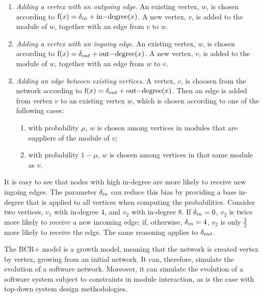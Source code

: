 \begin{enumerate}

\item \emph{Adding a vertex with an outgoing edge}. An existing vertex, $w$, is
chosen according to $\mathrm{f}(x) = \delta_{in} + \mathrm{in\relax{-}degree}(x)$. A new
vertex, $v$, is added to the module of $w$, together with an edge from $v$ to
$w$.

\item \emph{Adding a vertex with an ingoing edge}. An existing vertex, $w$, is
chosen according to $\mathrm{f}(x) = \delta_{out} + \mathrm{out\relax{-}degree}(x)$. A
new vertex, $v$, is added to the module of $w$, together with an edge from $w$
to $v$.

\item \emph{Adding an edge between existing vertices}. A vertex, $v$, is choosen
from the network according to $\mathrm{f}(x) = \delta_{out} +
\mathrm{out\relax{-}degree}(x)$.  Then an edge is added from vertex $v$ to an
existing vertex $w$, which is chosen according to one of the following cases:

\begin{enumerate}
  \item with probability $\mu$, $w$ is chosen among vertices in modules that are
  suppliers of the module of $v$;
  \item with probability $1 - \mu$, $w$ is chosen among vertices in that same
  module as $v$.
\end{enumerate}

\end{enumerate}

It is easy to see that nodes with high in-degree are more likely to receive new
ingoing edges. The parameter $\delta_{in}$ can reduce this bias by providing a base
in-degree that is applied to all vertices when computing the probabilities.
Consider two vertices, $v_1$ with in-degree 4, and $v_2$ with in-degree 8. If
$\delta_{in} = 0$, $v_2$ is twice more likely to receive a new incoming edge; if,
otherwise, $\delta_{in} = 4$, $v_2$ is only $\frac{3}{2}$ more likely to receive the
edge. The same reasoning applies to $\delta_{out}$.

The BCR+ model is a growth model, meaning that the network is created vertex by
vertex, growing from an initial network. It can, therefore, simulate the
evolution of a software network. Moreover, it can simulate the evolution of a
software system subject to constraints in module interaction, as is the case
with top-down system design methodologies.

